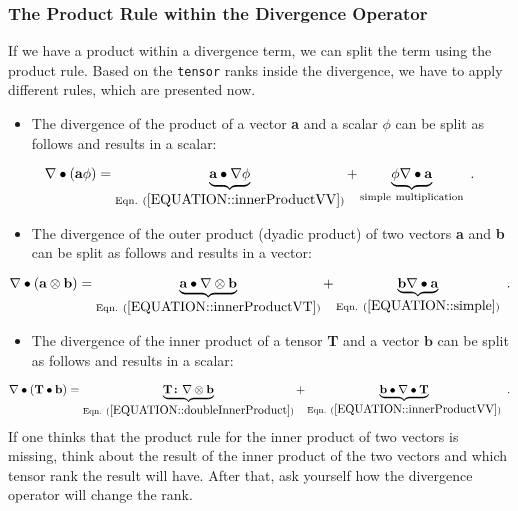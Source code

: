 \subsubsection{The Product Rule within the Divergence Operator}
%
%
	If we have a product within a divergence term, we can split the term using
    the product rule. Based on the \texttt{tensor} ranks inside the divergence,
    we have to apply different rules, which are presented now.
%
%
\begin{itemize}
    \item The divergence of the product of a vector \textbf{a} and a scalar
    $\phi$ can be split as follows and results in a scalar:
\end{itemize}
%
%
\begin{equation}
 \nabla \bullet (\textbf{a} \phi)  =  \underbrace{\textbf{a} \bullet \nabla \phi}_{\mathrm{Eqn.~} (\ref{EQUATION::innerProductVV})} + \underbrace{\phi \nabla \bullet \textbf{a}}_{\mathrm{simple~multiplication}}~.
 \label{EQUATION::productRuleVS}
\end{equation}
%
%
\begin{itemize}
    \item The divergence of the outer product (dyadic product) of two vectors
    \textbf{a} and \textbf{b} can be split as follows and results in a vector:
\end{itemize}
%
%
\begin{equation}
 \nabla \bullet (\textbf{a} \otimes \textbf{b})  =  \underbrace{\textbf{a} \bullet \nabla \otimes \textbf{b}}_{\mathrm{Eqn.~}(\ref{EQUATION::innerProductVT})} + \underbrace{\textbf{b} \nabla \bullet \textbf{a}}_{\mathrm{Eqn.~}(\ref{EQUATION::simple})} ~.
 \label{EQUATION::productRuleVV}
\end{equation}
%
%
\begin{itemize}
    \item The divergence of the inner product of a tensor \textbf{T} and a
    vector $\textbf{b}$ can be split as follows and results in a scalar:
\end{itemize}
%
%
\begin{equation}
 \nabla \bullet (\textbf{T} \bullet \textbf{b})  =  \underbrace{\textbf{T} \boldsymbol \colon \nabla \otimes \textbf{b}}_{\mathrm{Eqn.~} (\ref{EQUATION::doubleInnerProduct})} + \underbrace{\textbf{b} \bullet \nabla \bullet \textbf{T}}_{\mathrm{Eqn.~}(\ref{EQUATION::innerProductVV})} ~.
 \label{EQUATION::productRuleTV}
\end{equation}
%
%
	If one thinks that the product rule for the inner product of two vectors
    is missing, think about the result of the inner product of the two vectors
    and which tensor rank the result will have. After that, ask yourself how
    the divergence operator will change the rank.
%
%
%
%
